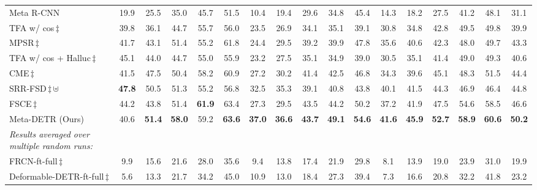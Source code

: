 \documentclass[letterpaper]{article} \usepackage{aaai22}  \usepackage{times}  \usepackage{helvet}  \usepackage{courier}  \usepackage[hyphens]{url}  \usepackage{graphicx} \urlstyle{rm} \def\UrlFont{\rm}  \usepackage{natbib}  \usepackage{caption} \DeclareCaptionStyle{ruled}{labelfont=normalfont,labelsep=colon,strut=off} \frenchspacing  \setlength{\pdfpagewidth}{8.5in}  \setlength{\pdfpageheight}{11in}  \usepackage{algorithm}
\begin{document}
\begin{table*}[t]
\begin{center}
{\begin{tabular}[t]{l|ccccc|ccccc|ccccc|c}
Meta R-CNN\;\cite{metarcnn} & 19.9 & 25.5 & 35.0 & 45.7 & 51.5 & 10.4 & 19.4 & 29.6 & 34.8 & 45.4 & 14.3 & 18.2 & 27.5 & 41.2 & 48.1 & 31.1 \\



TFA w/ cos\;\cite{fsdet}\,$\ddag$ & 39.8 & 36.1 & 44.7 & 55.7 & 56.0 & 23.5 & 26.9 & 34.1 & 35.1 & 39.1 & 30.8 & 34.8 & 42.8 & 49.5 & 49.8 & 39.9 \\

MPSR\;\cite{MPSR}\,$\ddag$ & 41.7 & 43.1 & 51.4 & 55.2 & 61.8 & 24.4 & 29.5 & 39.2 & 39.9 & 47.8 & 35.6 & 40.6 & 42.3 & 48.0 & 49.7 & 43.3 \\

TFA w/ cos + Halluc\;\cite{Halluc_FSD}\,$\ddag$ & 45.1 & 44.0 & 44.7 & 55.0 & 55.9 & 23.2 & 27.5 & 35.1 & 34.9 & 39.0 & 30.5 & 35.1 & 41.4 & 49.0 & 49.3 & 40.6 \\

CME\;\cite{CME}\,$\ddag$ & 41.5 & 47.5 & 50.4 & 58.2 & 60.9 & 27.2 & 30.2 & 41.4 & 42.5 & 46.8 & 34.3 & 39.6 & 45.1 & 48.3 & 51.5 & 44.4 \\

SRR-FSD\;\cite{SRR-FSD}\,$\ddag$\,$\uplus$ & \textbf{47.8} & 50.5 & 51.3 & 55.2 & 56.8 & 32.5 & 35.3 & 39.1 & 40.8 & 43.8 & 40.1 & 41.5 & 44.3 & 46.9 & 46.4 & 44.8\\

FSCE\;\cite{fsce}\,$\ddag$ & 44.2 & 43.8 & 51.4 & \textbf{61.9} & 63.4 & 27.3 & 29.5 & 43.5 & 44.2 & 50.2 & 37.2 & 41.9 & 47.5 & 54.6 & 58.5 & 46.6\\

\rowcolor{black!6} Meta-DETR (Ours) & 40.6 & \textbf{51.4} & \textbf{58.0} & 59.2 & \textbf{63.6} & \textbf{37.0} & \textbf{36.6} & \textbf{43.7} & \textbf{49.1} & \textbf{54.6} & \textbf{41.6} & \textbf{45.9} & \textbf{52.7} & \textbf{58.9} & \textbf{60.6} & \textbf{50.2} \\\midrule[0.68pt]

\textit{Results averaged over multiple random runs:} & & & & & & & & & & & & & & & \\

FRCN-ft-full\;\cite{FasterRCNN}\,$\ddag$ & 9.9 & 15.6 & 21.6 & 28.0 & 35.6 & 9.4 & 13.8 & 17.4 & 21.9 & 29.8 & 8.1 & 13.9 & 19.0 & 23.9 & 31.0 & 19.9 \\

Deformable-DETR-ft-full\;\cite{DeformableDETR}\,$\ddag$ & 5.6 & 13.3 & 21.7 & 34.2 & 45.0 & 10.9 & 13.0 & 18.4 & 27.3 & 39.4 & 7.3 & 16.6 & 20.8 & 32.2 & 41.8 & 23.2 \\




\end{tabular}}
\end{center}
\end{table*}
\end{document}
